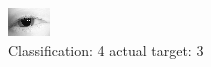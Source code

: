 \begin{figure}[h!]
\begin{center}
\includegraphics[width=0.60\columnwidth]{figures/ID50_class_4_target_3.png}
\end{center}
\caption{ Classification: 4 actual target: 3}
\label{fig:ID50_class_4_target_3}
\end{figure}
